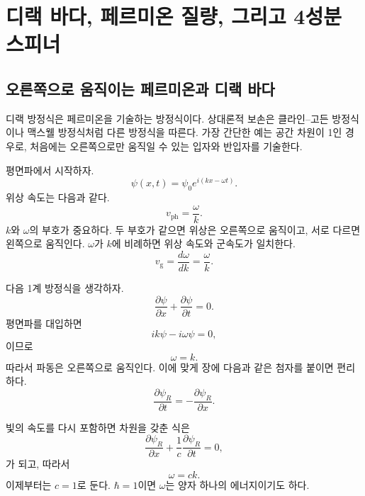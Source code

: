 \chapter{디랙 바다, 페르미온 질량, 그리고 4성분 스피너}

\section{오른쪽으로 움직이는 페르미온과 디랙 바다}

디랙 방정식은 페르미온을 기술하는 방정식이다. 상대론적 보손은 클라인--고든 방정식이나 맥스웰 방정식처럼 다른 방정식을 따른다. 가장 간단한 예는 공간 차원이 1인 경우로, 처음에는 오른쪽으로만 움직일 수 있는 입자와 반입자를 기술한다.

평면파에서 시작하자.
\begin{equation}
\psi(x,t)=\psi_0 e^{i(kx-\omega t)}.
\end{equation}
위상 속도는 다음과 같다.
\begin{equation}
v_{\mathrm{ph}}=\frac{\omega}{k}.
\end{equation}
\(k\)와 \(\omega\)의 부호가 중요하다. 두 부호가 같으면 위상은 오른쪽으로 움직이고, 서로 다르면 왼쪽으로 움직인다. \(\omega\)가 \(k\)에 비례하면 위상 속도와 군속도가 일치한다.
\begin{equation}
v_{\mathrm{g}}=\frac{d\omega}{dk}=\frac{\omega}{k}.
\end{equation}

다음 1계 방정식을 생각하자.
\begin{equation}
\frac{\partial\psi}{\partial x}
+
\frac{\partial\psi}{\partial t}
=0.
\end{equation}
평면파를 대입하면
\begin{equation}
ik\psi-i\omega\psi=0,
\end{equation}
이므로
\begin{equation}
\omega=k.
\end{equation}
따라서 파동은 오른쪽으로 움직인다. 이에 맞게 장에 다음과 같은 첨자를 붙이면 편리하다.
\begin{equation}
\frac{\partial\psi_R}{\partial t}
=
-\frac{\partial\psi_R}{\partial x}.
\end{equation}

빛의 속도를 다시 포함하면 차원을 갖춘 식은
\begin{equation}
\frac{\partial\psi_R}{\partial x}
+
\frac{1}{c}\frac{\partial\psi_R}{\partial t}
=0,
\end{equation}
가 되고, 따라서
\begin{equation}
\omega=ck.
\end{equation}
이제부터는 \(c=1\)로 둔다. \(\hbar=1\)이면 \(\omega\)는 양자 하나의 에너지이기도 하다.

